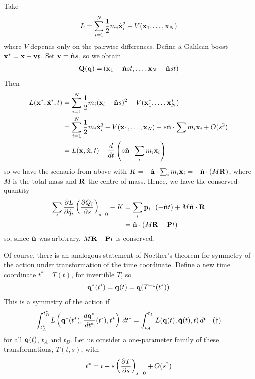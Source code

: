\documentclass{../../template/note}
\begin{document}
    \begin{example*}
        Take
        \begin{align*}
            L = \sum_{i=1}^N \frac 1 2 m_i \dot{\V x}_i^2 - V(\V x_1, \dots, \V x_N)
        \end{align*}
        where $V$ depends only on the pairwise differences. Define a Galilean boost $\V x^* = \V x - \V v t$. Set $\V v = \hvec n s$, so we obtain
        \begin{align*}
            \V Q(\V q) = (\V x_1 - \hvec n st, \dots, \V x_N - \hvec n st)
        \end{align*}
        Then
        \begin{align*}
            L(\V x^*, \dot{\V x}^*, t) &= \sum_{i=1}^N \frac 1 2 m_i (\V x_i - \hvec n s)^2 - V(\V x_1^*, \dots, \V x_N^*) \\
            &= \sum_{i=1}^N \frac 1 2 m_i \dot{\V x}_i^2 - V(\V x_1, \dots, \V x_N) - s\hvec n \cdot \sum m_i \dot{\V x}_i + O(s^2) \\
            &= L(\V x, \dot{\V x}, t) - \frac{d}{dt}\left(s\hvec n \cdot \sum_i m_i \V x_i\right)
        \end{align*}
        so we have the scenario from above with $K = -\hvec n \cdot \sum_i m_i \V x_i = -\hvec n \cdot (M\V R)$, where $M$ is the total mass and $\V R$ the centre of mass. Hence, we have the conserved quantity
        \begin{align*}
            \sum_i \pd{L}{\dot q_i} \left(\pd{Q_i}{s}\right)_{s=0} - K &= \sum_i \V p_i \cdot (-\hvec n t) + M \hvec n \cdot \V R \\
            &= \hvec n \cdot (M \V R - \V P t)
        \end{align*}
        so, since $\hvec n$ was arbitrary, $M \V R - \V P t$ is conserved.
    \end{example*}
    
    Of course, there is an analogous statement of Noether's theorem for symmetry of the action under transformation of the time coordinate. Define a new time coordinate $t^* = T(t)$, for invertible $T$, so
    \begin{align*}
        \V q^*(t^*) = \V q(t) = \V q(T^{-1}(t^*))
    \end{align*}
    This is a symmetry of the action if
    \begin{align*}
        \int_{t_A^*}^{t_B^*} L\left(\V q^*(t^*), \frac{d \V q^*}{dt^*}(t^*), t^*\right) \D t^* = \int_{t_A}^{t_B} L(\V q(t), \dot{\V q}(t), t) \D t && (\dagger)
    \end{align*}
    for all $\V q(t)$, $t_A$ and $t_B$. Let us consider a one-parameter family of these transformations, $T(t, s)$, with
    \begin{align*}
        t^* = t + s \left(\pd{T}{s}\right)_{s=0} + O(s^2)
    \end{align*}
    
\end{document}
